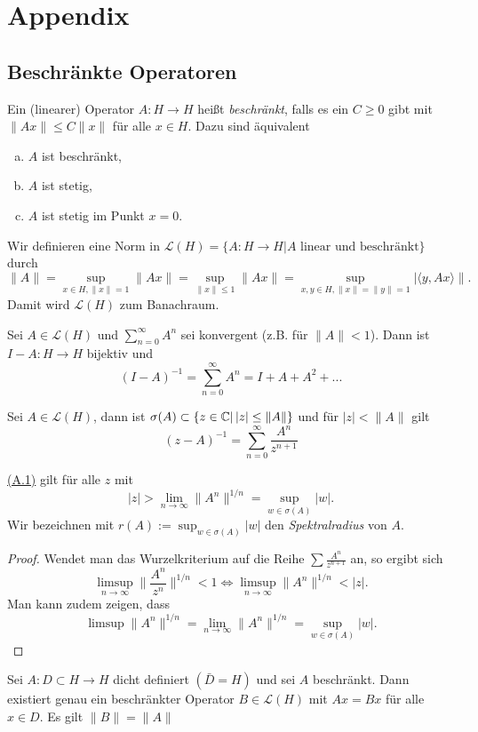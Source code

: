 \documentclass{mycourse}
\renewcommand{\eqref}[1]{\hyperref[#1]{(#1)}}
\begin{document}
\appendix
\chapter{Appendix}
\section{Beschränkte Operatoren}
Ein (linearer) Operator $A:H\to H$ heißt \emph{beschränkt}, falls es ein $C\ge 0$ gibt mit $\|Ax\| \le C\|x\|$ für alle $x\in H$. Dazu sind äquivalent
\begin{enumerate}[a)]
\item $A$ ist beschränkt,
\item $A$ ist stetig,
\item $A$ ist stetig im Punkt $x=0$.
\end{enumerate} 
Wir definieren eine Norm in $\mathcal L(H)=\{A: H\to H| A \text{ linear und beschränkt}\}$ durch
\[
\|A\|=\sup_{x\in H, \|x\|=1} \|Ax\|= \sup_{\|x\|\le 1} \|Ax\|=\sup_{x,y\in H, \|x\|=\|y\|=1} |\langle y, Ax\rangle\|.
\]
Damit wird $\mathcal L(H)$ zum Banachraum.
\begin{st}[Neumannreihe]
Sei $A\in \mathcal L(H)$ und 
$\sum_{n=0}^\infty A^n$ sei konvergent (z.B. für $\|A\|<1$). Dann ist $I-A: H\to H$ bijektiv und
\[
(I-A)^{-1}=\sum_{n=0}^\infty A^n=I+A+A^2+...
\]
\end{st}
\begin{st}
Sei $A\in \mathcal L(H)$, dann ist $\sigma(A)\subset \{z\in \mathbb{C} |\, |z|\le \|A\| \}$ und für $|z| < \|A\|$ gilt
\begin{equation}
(z-A)^{-1}=\sum_{n=0}^\infty \frac{A^n}{z^{n+1}} \label{A.1}
\end{equation}
\end{st}
\begin{nt*}
\eqref{A.1} gilt für alle $z$  mit
\[
|z| > \lim_{n\to \infty} \|A^n\|^{1/n}=\sup_{w\in \sigma(A)} |w|.
\]
Wir bezeichnen mit $r(A):= \sup_{w\in \sigma(A)} |w|$ den \emph{Spektralradius} von $A$.
\end{nt*}
\begin{proof}
Wendet man das Wurzelkriterium auf die Reihe $\sum \frac{A^n}{z^{n+1}}$ an, so ergibt sich
\[
\limsup_{n\to \infty} \big \|\frac{A^n}{z^n} \big \|^{1/n} <1 \iff \limsup_{n\to \infty} \|A^n\|^{1/n}< |z|.
\]
Man kann zudem zeigen, dass
\[
\limsup\|A^n\|^{1/n} = \lim_{n\to \infty} \|A^n\|^{1/n}=\sup_{w\in \sigma(A)} |w|.
\]
\end{proof}
\begin{st} \label{A.3}
Sei $A:D\subset H\to H$ dicht definiert $(\bar D=H)$ und sei $A$ beschränkt. Dann existiert genau ein beschränkter Operator $B\in \mathcal L(H)$ mit $Ax=Bx$ für alle $x\in D$. Es gilt $\|B\|=\|A\|$
\end{st}
\end{document}
